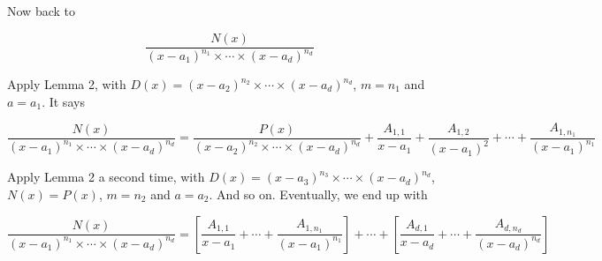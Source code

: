 Now back to

\[
    \frac{N(x)}{{(x-a_1)}^{n_1} \times \cdots \times {(x-a_d)}^{n_d}}
\]

Apply Lemma 2, with \(D(x) = {(x - a_2)}^{n_2} \times \cdots \times {(x - a_d)}^{n_d}\), \(m = n_1\) and 
\(a = a_1\). It says

\[
    \frac{N(x)}{{(x-a_1)}^{n_1} \times \cdots \times {(x-a_d)}^{n_d}} = \frac{P(x)}{{(x-a_2)}^{n_2} 
    \times \cdots \times {(x-a_d)}^{n_d}} + \frac{A_{1,1}}{x-a_1} + \frac{A_{1,2}}{{(x-a_1)}^2} + \cdots + 
    \frac{A_{1,n_1}}{{(x-a_1)}^{n_1}}
\]

Apply Lemma 2 a second time, with \(D(x) = {(x - a_3)}^{n_3} \times \cdots \times {(x - a_d)}^{n_d}\), 
\(N(x) = P(x)\), \(m = n_2\) and \(a = a_2\). And so on. Eventually, we end up with

\[
    \frac{N(x)}{{(x-a_1)}^{n_1} \times \cdots \times {(x-a_d)}^{n_d}} = \left[ \frac{A_{1,1}}{x-a_1} + 
    \cdots + \frac{A_{1,n_1}}{{(x-a_1)}^{n_1}} \right] + \cdots + \left[ \frac{A_{d,1}}{x-a_d} + \cdots + 
    \frac{A_{d,n_d}}{{(x-a_d)}^{n_d}} \right]
\]
